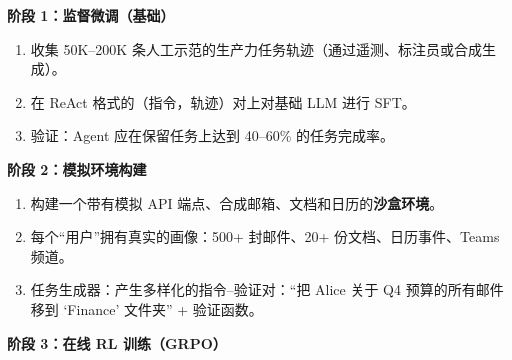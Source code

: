 \begin{keybox}
\textbf{阶段 1：监督微调（基础）}

\begin{enumerate}
  \item 收集 50K--200K 条人工示范的生产力任务轨迹（通过遥测、标注员或合成生成）。
  \item 在 ReAct 格式的（指令，轨迹）对上对基础 LLM 进行 SFT。
  \item 验证：Agent 应在保留任务上达到 40--60\% 的任务完成率。
\end{enumerate}

\textbf{阶段 2：模拟环境构建}

\begin{enumerate}
  \item 构建一个带有模拟 API 端点、合成邮箱、文档和日历的\textbf{沙盒环境}。
  \item 每个``用户''拥有真实的画像：500+ 封邮件、20+ 份文档、日历事件、Teams 频道。
  \item 任务生成器：产生多样化的指令--验证对：``把 Alice 关于 Q4 预算的所有邮件移到 `Finance' 文件夹'' + 验证函数。
\end{enumerate}

\textbf{阶段 3：在线 RL 训练（GRPO）}


\end{keybox}
